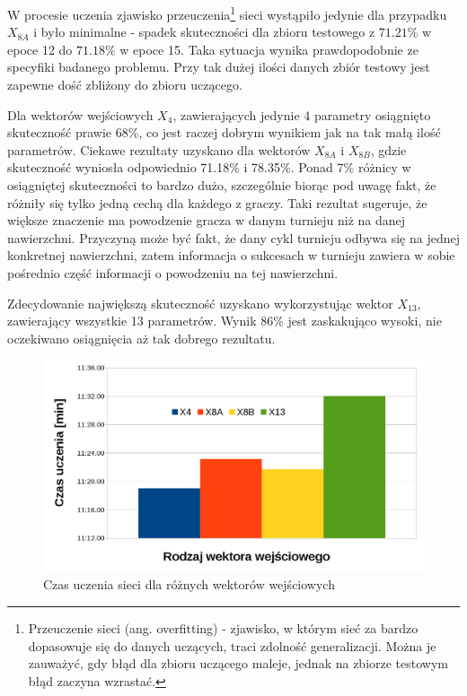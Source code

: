W procesie uczenia zjawisko przeuczenia\footnote{Przeuczenie sieci (ang. overfitting) - zjawisko, w którym sieć za bardzo dopasowuje się do danych uczących, traci zdolność generalizacji. Można je zauważyć, gdy błąd dla zbioru uczącego maleje, jednak na zbiorze testowym błąd zaczyna wzrastać.} sieci wystąpiło jedynie dla przypadku $X_{8A}$ i było minimalne - spadek skuteczności dla zbioru testowego z $71.21\%$ w epoce 12 do $71.18\%$ w epoce 15. Taka sytuacja wynika prawdopodobnie ze specyfiki badanego problemu. Przy tak dużej ilości danych zbiór testowy jest zapewne dość zbliżony do zbioru uczącego.

Dla wektorów wejściowych $X_4$, zawierających jedynie 4 parametry osiągnięto skuteczność prawie 68\%, co jest raczej dobrym wynikiem jak na tak małą ilość parametrów. Ciekawe rezultaty uzyskano dla wektorów $X_{8A}$ i $X_{8B}$, gdzie skuteczność wyniosła odpowiednio 71.18\% i 78.35\%. Ponad 7\% różnicy w osiągniętej skuteczności to bardzo dużo, szczególnie biorąc pod uwagę fakt, że różniły się tylko jedną cechą dla każdego z graczy. Taki rezultat sugeruje, że większe znaczenie ma powodzenie gracza w danym turnieju niż na danej nawierzchni. Przyczyną może być fakt, że dany cykl turnieju odbywa się na jednej konkretnej nawierzchni, zatem informacja o sukcesach w turnieju zawiera w sobie pośrednio część informacji o powodzeniu na tej nawierzchni.

Zdecydowanie największą skuteczność uzyskano wykorzystując wektor $X_{13}$, zawierający wszystkie 13 parametrów. Wynik 86\% jest zaskakująco wysoki, nie oczekiwano osiągnięcia aż tak dobrego rezultatu.

\begin{figure}
\includegraphics[width=\textwidth]{time_x.png}
\caption{Czas uczenia sieci dla różnych wektorów wejściowych}
\label{fig:timex}
\end{figure}

